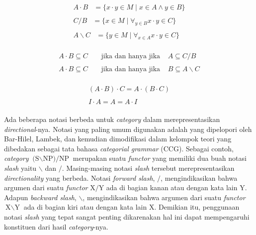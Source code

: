 \begin{align}
  \begin{split}\label{catg:syn:1}
    A \cdot B & = \{x \cdot y \in M \mid x \in A \land y \in B\}
  \end{split}\\
  \begin{split}\label{catg:syn:2}
    C/B & = \{x \in M \mid \forall_{y \in B} x \cdot y \in C\}
  \end{split}\\
  \begin{split}\label{catg:syn:3}
    A\backslash{}C & = \{y \in M \mid \forall_{x \in A} x \cdot y \in C\}
  \end{split}
\end{align}

\begin{align}
  \begin{split}\label{catg:syn:4}
    A \cdot B \subseteq C & \;\;\;\;\text{jika dan hanya jika}\;\;\;\; A \subseteq C/B
  \end{split}\\
  \begin{split}\label{catg:syn:5}
    A \cdot B \subseteq C & \;\;\;\;\text{jika dan hanya jika}\;\;\;\; B \subseteq A\backslash{}C
  \end{split}
\end{align}

\begin{align}
  \begin{split}\label{catg:syn:6}
    (A \cdot B) \cdot C = A \cdot (B \cdot C)
  \end{split}\\
  \begin{split}\label{catg:syn:7}
    I \cdot A = A = A \cdot I
  \end{split}
\end{align}

Ada beberapa notasi berbeda untuk \textit{category} dalam merepresentasikan \textit{directional}-nya.
Notasi yang paling umum digunakan adalah  yang dipelopori oleh Bar-Hilel,
Lambek, dan kemudian dimodifikasi dalam kelompok teori yang dibedakan sebagai tata bahasa
 \textit{categorial grammar} (CCG).
Sebagai contoh, \textit{category} $\text{(S$\backslash$NP)/NP}$ merupakan suatu \textit{functor} yang
memiliki dua buah notasi \textit{slash} yaitu $\backslash$ dan $/$.
Masing-masing notasi \textit{slash} tersebut merepresentasikan \textit{directionality} yang berbeda.
Notasi \textit{forward slash}, $/$, mengindikasikan bahwa argumen dari suatu \textit{functor}
$\text{X}/\text{Y}$ ada di bagian kanan atau dengan kata lain $\text{Y}$.
Adapun \textit{backward slash}, $\backslash$, mengindikasikan bahwa argumen dari suatu \textit{functor}
$\text{X}\backslash\text{Y}$ ada di bagian kiri atau dengan kata lain $\text{X}$.
Demikian itu, penggunaan notasi \textit{slash} yang tepat sangat penting dikarenakan hal ini dapat
mempengaruhi konstituen dari hasil  \textit{category}-nya.
\\


